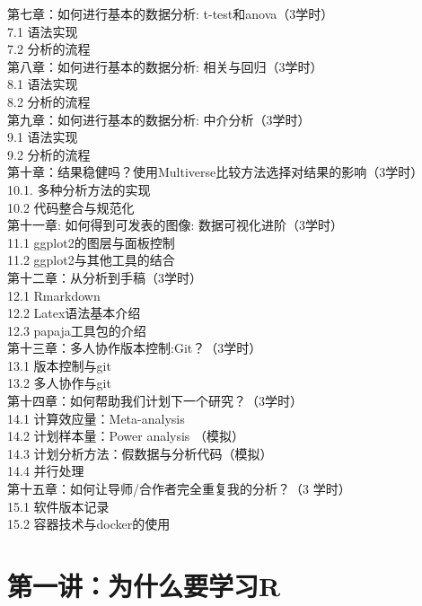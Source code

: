 \documentclass[
  oneside]{book}
\begin{document}
第七章：如何进行基本的数据分析: t-test和anova（3学时）\\
7.1 语法实现\\
7.2 分析的流程\\

第八章：如何进行基本的数据分析: 相关与回归（3学时）\\
8.1 语法实现\\
8.2 分析的流程\\

第九章：如何进行基本的数据分析: 中介分析（3学时）\\
9.1 语法实现\\
9.2 分析的流程\\

第十章：结果稳健吗？使用Multiverse比较方法选择对结果的影响（3学时）\\
10.1. 多种分析方法的实现\\
10.2 代码整合与规范化\\

第十一章: 如何得到可发表的图像: 数据可视化进阶（3学时）\\
11.1 ggplot2的图层与面板控制\\
11.2 ggplot2与其他工具的结合\\

第十二章：从分析到手稿（3学时）\\
12.1 Rmarkdown\\
12.2 Latex语法基本介绍\\
12.3 papaja工具包的介绍\\

第十三章：多人协作版本控制:Git？（3学时）\\
13.1 版本控制与git\\
13.2 多人协作与git\\

第十四章：如何帮助我们计划下一个研究？（3学时）\\
14.1 计算效应量：Meta-analysis\\
14.2 计划样本量：Power analysis （模拟）\\
14.3 计划分析方法：假数据与分析代码（模拟）\\
14.4 并行处理\\

第十五章：如何让导师/合作者完全重复我的分析？（3 学时）\\
15.1 软件版本记录\\
15.2 容器技术与docker的使用\\

\hypertarget{lesson-1}{%
\chapter{第一讲：为什么要学习R}\label{lesson-1}}
\end{document}
